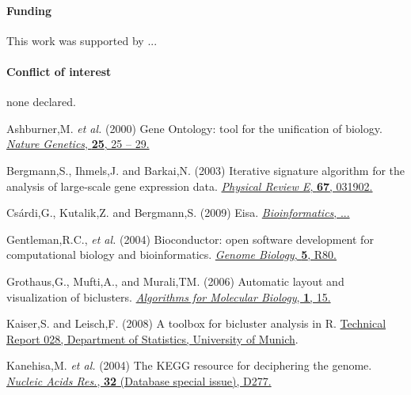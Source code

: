 \documentclass[round]{bioinfo}
\begin{document}

\paragraph{Funding\textcolon} This work was supported by ...

\paragraph{Conflict of interest\textcolon} none declared.

\begin{thebibliography}{6}

Ashburner,M. \emph{et al.} (2000)
Gene Ontology: tool for the unification of biology.
\href{http://dx.doi.org/10.1038/75556}{\emph{Nature Genetics}, {\bf 25}, 25 -- 29.}

Bergmann,S., Ihmels,J. and Barkai,N. (2003)
Iterative signature algorithm for the analysis of large-scale gene expression data.
\href{http://dx.doi.org/10.1103/PhysRevE.67.031902 }{\emph{Physical Review E}, {\bf 67}, 031902.}

Cs{\'a}rdi,G., Kutalik,Z. and Bergmann,S. (2009)
Eisa.
\href{http://dx.doi.org/}{\emph{Bioinformatics}, ...}

Gentleman,R.C., \emph{et al.} (2004)
Bioconductor: open software development for computational biology and bioinformatics.
\href{http://dx.doi.org/10.1186/gb-2004-5-10-r80}{\emph{Genome Biology}, {\bf 5}, R80.}

Grothaus,G., Mufti,A., and Murali,TM. (2006)
Automatic layout and visualization of biclusters.
\href{http://dx.doi.org/10.1186/1748-7188-1-15}{\emph{Algorithms for Molecular Biology}, {\bf 1}, 15.}

Kaiser,S. and Leisch,F. (2008)
A toolbox for bicluster analysis in R.
\href{http://epub.ub.uni-muenchen.de/3293/}{Technical Report 028, Department of Statistics, University of Munich}.

Kanehisa,M. \emph{et al.} (2004)
The KEGG resource for deciphering the genome.
\href{http://dx.doi.org/10.1093/nar/gkh063}{\emph{Nucleic Acids Res.}, {\bf 32} (Database special issue), D277.}


\end{thebibliography}
\end{document}
